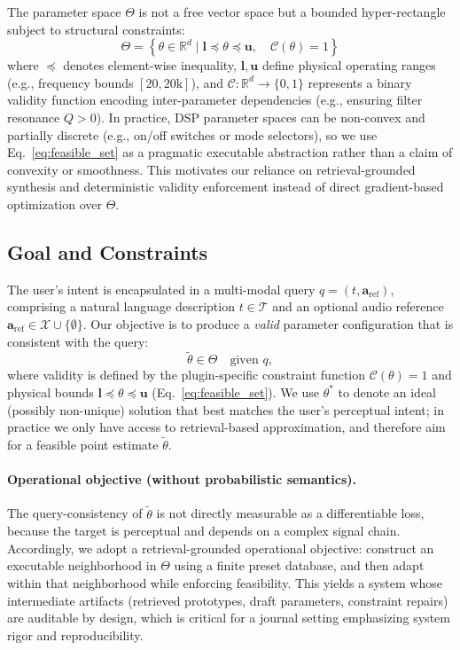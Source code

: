 The parameter space $\Theta$ is not a free vector space but a bounded hyper-rectangle subject to structural constraints:
\begin{equation}
    \label{eq:feasible_set}
    \Theta = \left\{ \theta \in \mathbb{R}^d \mid \mathbf{l} \preceq \theta \preceq \mathbf{u}, \quad \mathcal{C}(\theta) = 1 \right\}
\end{equation}
where $\preceq$ denotes element-wise inequality, $\mathbf{l}, \mathbf{u}$ define physical operating ranges (e.g., frequency bounds $[20, 20\text{k}]$), and $\mathcal{C}: \mathbb{R}^d \to \{0, 1\}$ represents a binary validity function encoding inter-parameter dependencies (e.g., ensuring filter resonance $Q > 0$).
In practice, DSP parameter spaces can be non-convex and partially discrete (e.g., on/off switches or mode selectors), so we use Eq.~\ref{eq:feasible_set} as a pragmatic executable abstraction rather than a claim of convexity or smoothness. This motivates our reliance on retrieval-grounded synthesis and deterministic validity enforcement instead of direct gradient-based optimization over $\Theta$.

\subsection{Goal and Constraints}
The user's intent is encapsulated in a multi-modal query $q = (t, \mathbf{a}_{\text{ref}})$, comprising a natural language description $t \in \mathcal{T}$ and an optional audio reference $\mathbf{a}_{\text{ref}} \in \mathcal{X} \cup \{\emptyset\}$. Our objective is to produce a \emph{valid} parameter configuration that is consistent with the query:
\begin{equation}
	\tilde{\theta} \in \Theta \quad \text{given } q,
\end{equation}
where validity is defined by the plugin-specific constraint function $\mathcal{C}(\theta)=1$ and physical bounds $\mathbf{l} \preceq \theta \preceq \mathbf{u}$ (Eq.~\ref{eq:feasible_set}). We use $\theta^*$ to denote an ideal (possibly non-unique) solution that best matches the user's perceptual intent; in practice we only have access to retrieval-based approximation, and therefore aim for a feasible point estimate $\tilde{\theta}$.

\paragraph{Operational objective (without probabilistic semantics).}
The query-consistency of $\tilde{\theta}$ is not directly measurable as a differentiable loss, because the target is perceptual and depends on a complex signal chain. Accordingly, we adopt a retrieval-grounded operational objective: construct an executable neighborhood in $\Theta$ using a finite preset database, and then adapt within that neighborhood while enforcing feasibility. This yields a system whose intermediate artifacts (retrieved prototypes, draft parameters, constraint repairs) are auditable by design, which is critical for a journal setting emphasizing system rigor and reproducibility.

